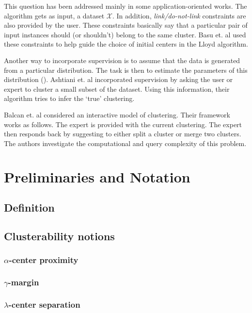 \documentclass[letterpaper,12pt,titlepage,oneside,final]{book}
\newcommand{\mc}{\mathcal}
\begin{document}
This question has been addressed mainly in some application-oriented works. The algorithm gets as input, a dataset $\mc X$. In addition, \textit{link/do-not-link} constraints are also provided by the user. These constraints basically say that a particular pair of input instances should (or shouldn't) belong to the same cluster. Basu et. al \cite{basu2002semi} used these constraints to help guide the choice of initial centers in the Lloyd algorithm. 

Another way to incorporate supervision is to assume that the data is generated from a particular distribution. The task is then to estimate the parameters of this distribution (\cite{basu2004probabilistic, kulis2009semi}). Ashtiani et. al \cite{ashtiani2015representation} incorporated supervision by asking the user or expert to cluster a small subset of the dataset. Using this information, their algorithm tries to infer the `true' clustering. 

Balcan et. al \cite{balcan2008clustering} considered an interactive model of clustering. Their framework works as follows. The expert is provided with the current clustering. The expert then responds back by suggesting to either split a cluster or merge two clusters. The authors investigate the computational and query complexity of this problem. 
\chapter{Preliminaries and Notation}
\label{METHOD}
\section{Definition}
\section{Clusterability notions}
	\subsection{$\alpha$-center proximity}
	\subsection{$\gamma$-margin}
	\subsection{$\lambda$-center separation}
\end{document}

